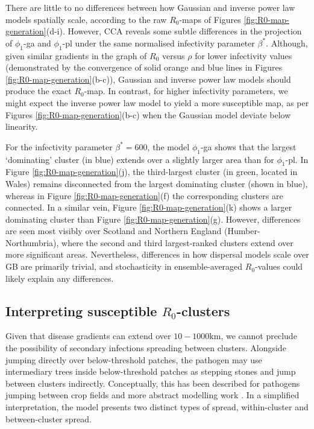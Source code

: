 There are little to no differences between how Gaussian and inverse power law models spatially scale, according to the raw $R_0$-maps of Figures \ref{fig:R0-map-generation}(d-i).
However, CCA reveals some subtle differences in the projection of $\phi_1$-ga and $\phi_1$-pl under the same normalised infectivity parameter $\beta^*$.
Although, given similar gradients in the graph of $R_0$ versus $\rho$ for lower infectivity values
(demonstrated by the convergence of solid orange and blue lines in Figures \ref{fig:R0-map-generation}(b-c)), 
Gaussian and inverse power law models should produce the exact $R_0$-map.
In contrast, for higher infectivity parameters, we might expect the inverse power law model to yield a more susceptible map, as per Figures \ref{fig:R0-map-generation}(b-c) when the Gaussian model deviate below linearity.

For the infectivity parameter $\beta^*=600$, the model $\phi_1$-ga shows that the largest `dominating' cluster (in blue) extends over a slightly larger area than for $\phi_1$-pl.
In Figure \ref{fig:R0-map-generation}(j), the third-largest cluster (in green, located in Wales) remains disconnected from the largest dominating cluster (shown in blue), whereas in Figure \ref{fig:R0-map-generation}(f) the corresponding clusters are connected. In a similar vein, Figure \ref{fig:R0-map-generation}(k) shows a larger dominating cluster than Figure \ref{fig:R0-map-generation}(g).
However, differences are seen most visibly over Scotland and Northern England (Humber-Northumbria), where the second and third largest-ranked clusters extend over more significant areas.
Nevertheless, differences in how dispersal models scale over GB are primarily trivial, and stochasticity in ensemble-averaged $R_0$-values could likely explain any differences.

\subsection{Interpreting susceptible $R_0$-clusters}

Given that disease gradients can extend over $10-1000\mathrm{km}$, we cannot preclude the possibility of secondary infections spreading between clusters.
Alongside jumping directly over below-threshold patches, the pathogen may use intermediary trees inside below-threshold patches as stepping stones and jump between clusters indirectly. 
Conceptually, this has been described for pathogens jumping between crop fields \cite{Gilligan-disease-management} and more abstract modelling work \cite{wingen2013long}.
In a simplified interpretation, the model presents two distinct types of spread, within-cluster and between-cluster spread. 

